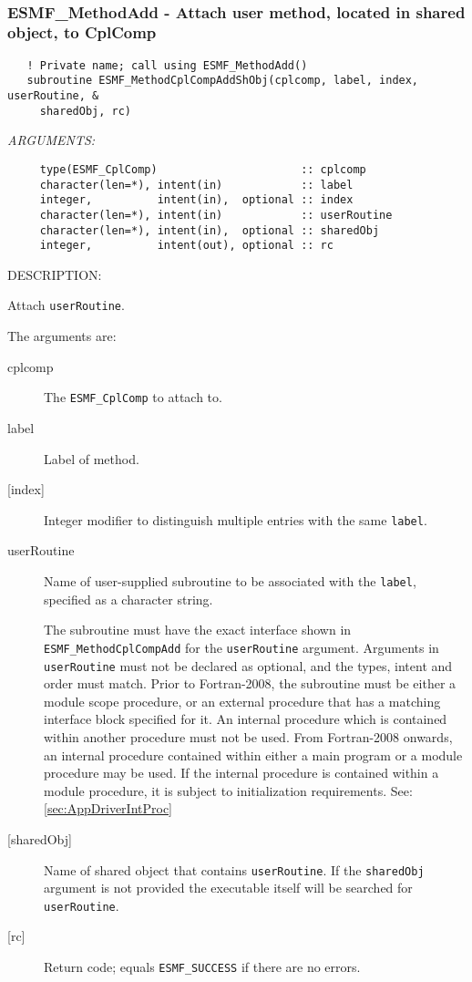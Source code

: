  
\mbox{}\hrulefill\ 
 
\subsubsection [ESMF\_MethodAdd] {ESMF\_MethodAdd - Attach user method, located in shared object, to CplComp}


  
\begin{verbatim}   ! Private name; call using ESMF_MethodAdd()
   subroutine ESMF_MethodCplCompAddShObj(cplcomp, label, index, userRoutine, &
     sharedObj, rc)\end{verbatim}{\em ARGUMENTS:}
\begin{verbatim}     type(ESMF_CplComp)                      :: cplcomp
     character(len=*), intent(in)            :: label
     integer,          intent(in),  optional :: index
     character(len=*), intent(in)            :: userRoutine
     character(len=*), intent(in),  optional :: sharedObj
     integer,          intent(out), optional :: rc \end{verbatim}
{\sf DESCRIPTION:\\ }


   Attach {\tt userRoutine}.
  
   The arguments are:
   \begin{description}
   \item[cplcomp]
     The {\tt ESMF\_CplComp} to attach to.
   \item[label]
     Label of method.
   \item[{[index]}]
     Integer modifier to distinguish multiple entries with the same {\tt label}.
   \item[userRoutine]
     Name of user-supplied subroutine to be associated with the {\tt label},
     specified as a character string.
  
     The subroutine must have the exact interface shown in {\tt ESMF\_MethodCplCompAdd}
     for the {\tt userRoutine} argument. Arguments in {\tt userRoutine}
     must not be declared as optional, and the types, intent and order must
     match.
     Prior to Fortran-2008, the subroutine must be either a module scope procedure,
     or an external procedure that has a matching interface block specified for it.
     An internal procedure which is contained within another procedure must not be used.
     From Fortran-2008 onwards, an internal procedure contained within either a main program
     or a module procedure may be used.  If the internal procedure is contained within a
     module procedure, it is subject to initialization requirements.  See: \ref{sec:AppDriverIntProc}
   \item[{[sharedObj]}]
     Name of shared object that contains {\tt userRoutine}. If the
     {\tt sharedObj} argument is not provided the executable itself will be
     searched for {\tt userRoutine}.
   \item[{[rc]}]
     Return code; equals {\tt ESMF\_SUCCESS} if there are no errors.
   \end{description}
   
